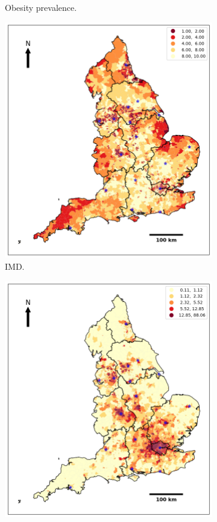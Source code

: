 \begin{figure}[ht]
\begin{subfigure}{.4\textwidth}
  \caption{Obesity prevalence.}
  \label{fig:A4.32}
\end{subfigure}
\begin{subfigure}{.4\textwidth}
  \centering
  \includegraphics[width=1\linewidth]{ucl-latex-thesis-templates-master/Image/datageo_IMDdecile_7.png}
  \caption{IMD.}
  \label{fig:A4.33}
\end{subfigure}
\begin{subfigure}{.4\textwidth}
  \centering
  \includegraphics[width=1\linewidth]{ucl-latex-thesis-templates-master/Image/datageo_Asian_8.png}

\end{subfigure}
\end{figure}
